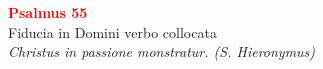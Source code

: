 


\def\greinitialformat#1{%
{\fontsize{39}{39}\selectfont #1}%
}




\vspace{0.3cm}
\begin{center}
 \textcolor{red}{\large \bf Psalmus 55}\\
Fiducia in Domini verbo collocata\\
\textit{\small Christus in passione monstratur. (S. Hieronymus)}
\end{center}
